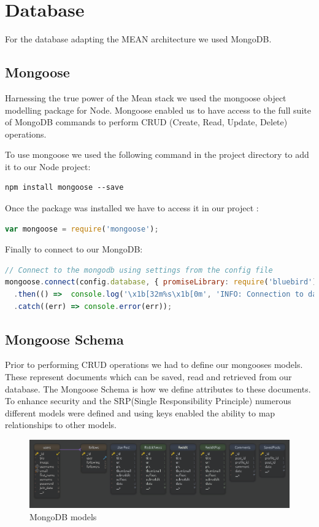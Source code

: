 \section{Database}
For the database adapting the MEAN architecture we used MongoDB.

\subsection{Mongoose}
Harnessing the true power of the Mean stack we used the mongoose object modelling package for Node. Mongoose enabled us to have access to the full suite of MongoDB commands to perform CRUD (Create, Read, Update, Delete) operations. 


To use mongoose we used the following command in the project directory to add it to our Node project:
\begin{lstlisting}[language=DOS]
npm install mongoose --save
\end{lstlisting}

Once the package was installed we have to access it in our project :
\begin{lstlisting}[language=JavaScript]
var mongoose = require('mongoose');
\end{lstlisting}

Finally to connect to our MongoDB:
\begin{lstlisting}[language=JavaScript]
// Connect to the mongodb using settings from the config file
mongoose.connect(config.database, { promiseLibrary: require('bluebird') })
  .then(() =>  console.log('\x1b[32m%s\x1b[0m', 'INFO: Connection to database succesfull'))
  .catch((err) => console.error(err));
\end{lstlisting}

\subsection{Mongoose Schema}
Prior to performing CRUD operations we had to define our  mongooses models. These represent documents which can be saved, read and retrieved from our database. The Mongoose Schema is how we define attributes to these documents. To enhance security and the SRP(Single Responsibility Principle) numerous different models were defined and using keys enabled the ability to map relationships to other models.

\begin{figure}[H]
  \includegraphics[width=\linewidth]{img/schemas.PNG}
  \caption{MongoDB models}
  \label{fig:schema}
\end{figure}

